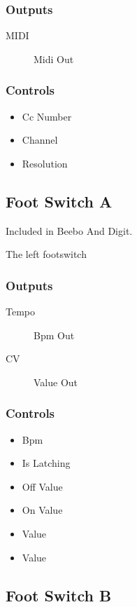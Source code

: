\subsubsection{Outputs}
\begin{description}
\item [MIDI] Midi Out
\end{description}

\subsubsection{Controls}
\begin{itemize}
\item Cc Number
\item Channel
\item Resolution
\end{itemize}

\subsection{Foot Switch A}

Included in Beebo And Digit.

The left footswitch



\subsubsection{Outputs}
\begin{description}
\item [Tempo] Bpm Out
\item [CV] Value Out
\end{description}

\subsubsection{Controls}
\begin{itemize}
\item Bpm
\item Is Latching
\item Off Value
\item On Value
\item Value
\item Value
\end{itemize}

\subsection{Foot Switch B}

